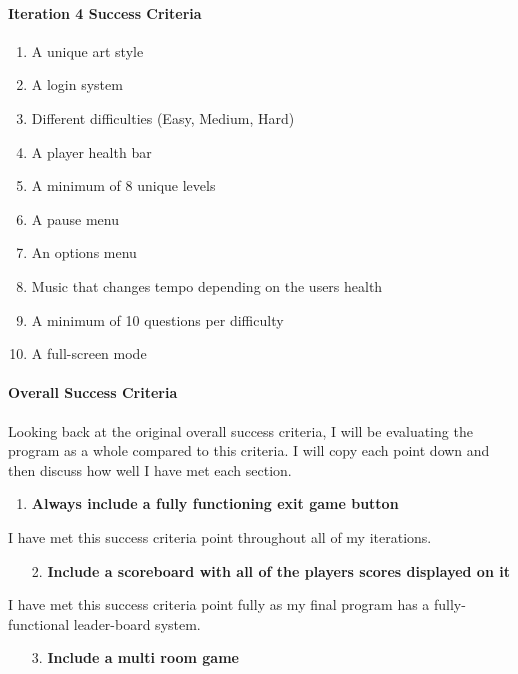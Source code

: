 \documentclass[12pt]{report}
\begin{document}
\paragraph{Iteration 4 Success Criteria}
\begin{enumerate}
    \item A unique art style
    \item A login system
    \item Different difficulties (Easy, Medium, Hard)
    \item A player health bar
    \item A minimum of 8 unique levels
    \item A pause menu 
    \item An options menu
    \item Music that changes tempo depending on the users health
    \item A minimum of 10 questions per difficulty
    \item A full-screen mode
\end{enumerate}

\pagebreak

\paragraph{Overall Success Criteria}
Looking back at the original overall success criteria, I will be evaluating the program as a whole compared to this criteria. I will copy each point down and then discuss how well I have met each section.

\begin{enumerate}
    \item \textbf{Always include a fully functioning exit game button}
\end{enumerate}

I have met this success criteria point throughout all of my iterations.

\begin{enumerate}
    \item[2.] \textbf{Include a scoreboard with all of the players scores displayed on it}
\end{enumerate}

I have met this success criteria point fully as my final program has a fully-functional leader-board system.

\begin{enumerate}
    \item[3.] \textbf{Include a multi room game}
\end{enumerate}
\end{document}

